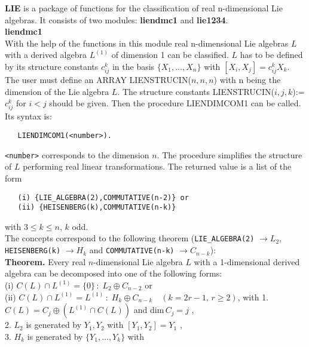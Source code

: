 
\textbf{LIE} is a package of functions for the classification of real n-dimensional
Lie algebras. It consists of two modules: \textbf{liendmc1} and \textbf{lie1234}.
\\[0.3cm]\textbf{\large liendmc1}\\[0.1cm]
With the help of the functions in this module real n-dimensional Lie algebras
$L$ with a derived algebra $L^{(1)}$ of dimension 1 can be classified. $L$ has
to be defined by its structure constants $c_{ij}^k$ in the basis
$\{X_1,\ldots,X_n\}$ with $[X_i,X_j]=c_{ij}^k X_k$. The user must define an
ARRAY LIENSTRUCIN($n,n,n$) with n being the dimension of the Lie algebra $L$.
The structure constants LIENSTRUCIN($i,j,k$):=$c_{ij}^k$ for $i<j$ should be
given. Then the procedure LIENDIMCOM1 can be called. Its syntax is:
\begin{verbatim}
   LIENDIMCOM1(<number>).
\end{verbatim}
{\tt <number>} corresponds to the dimension $n$. The procedure simplifies
the structure of $L$ performing real linear transformations. The returned
value is a list of the form
\begin{verbatim}
   (i) {LIE_ALGEBRA(2),COMMUTATIVE(n-2)} or
   (ii) {HEISENBERG(k),COMMUTATIVE(n-k)}
\end{verbatim}
with $3\leq k\leq n$, $k$ odd.\\
The concepts correspond to the following theorem ({\tt LIE\_ALGEBRA(2)}
$\rightarrow L_2$, {\tt HEISENBERG(k)} $\rightarrow H_k$ and
{\tt COMMUTATIVE(n-k)} $\rightarrow C_{n-k}$):\\[0.2cm]
\textbf{Theorem.} Every real $n$-dimensional Lie algebra $L$ with a 1-dimensional
derived algebra can be decomposed into one of the following forms:\\[0.1cm]
\hspace*{0.3cm} (i) $C(L)\cap L^{(1)}=\{0\}\, :\; L_2\oplus C_{n-2}$
or\\[0.05cm]
\hspace*{0.3cm} (ii) $C(L)\cap L^{(1)}=L^{(1)}\, :\; H_k\oplus C_{n-k}\quad
(k=2r-1,\, r\geq 2)$, with\newpage
\hspace*{0.3cm} 1. $C(L)=C_j\oplus (L^{(1)}\cap C(L))$
and dim$\,C_j=j$ ,\\[0.05cm]
\hspace*{0.3cm} 2. $L_2$ is generated by
$Y_1,Y_2$ with $[Y_1,Y_2]=Y_1$ ,\\[0.05cm]
\hspace*{0.3cm} 3. $H_k$ is generated by $\{Y_1,\ldots,Y_k\}$ with\\
